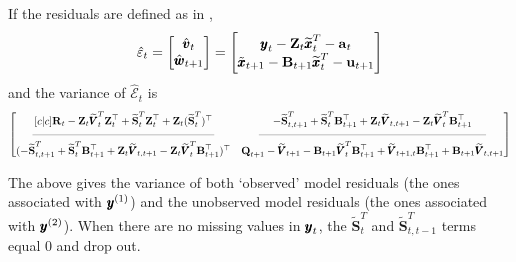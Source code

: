 \documentclass[]{article}
\def\UPS{\mbox{\boldmath $\Upsilon$}}
\def\XI{\mbox{\boldmath $\Xi$}}
\def\BB{\mbox{$\mathbf B$}}	\def\bb{\mbox{$\mathbf b$}} \def\Bb{\mbox{$\mathbf J$}} \def\Ba{\mbox{$\mathbf L$}} \def\Bm{\UPS}
\def\QQ{\mbox{$\mathbf Q$}}	 \def\qq{\mbox{$\mathbf q$}} \def\Qb{\mbox{$\mathbf G$}}  \def\Qm{\mathbb{Q}}
\def\RR{\mbox{$\mathbf R$}}	 \def\rr{\mbox{$\mathbf r$}} \def\Rb{\mbox{$\mathbf H$}}	\def\Rm{\mathbb{R}}
\def\Ss{\mbox{$\mathbf S$}}
\def\VV{\mbox{$\pmb{V}$}}	\def\vv{\mbox{$\pmb{v}$}}
\def\ZZ{\mbox{$\mathbf Z$}}	\def\zz{\mbox{$\mathbf z$}}	\def\Zb{\mbox{$\mathbf M$}} \def\Za{\mbox{$\mathbf N$}} \def\Zm{\XI}
\def\hatxt{\widetilde{\xx}_t^T}
\def\hatVt{\widetilde{\VV}_t^T}
\def\hatSt{\widetilde{\Ss}_t^T}
\def\hatSttm{\widetilde{\Ss}_t^{t-1}}
\def\hatSttm{\widetilde{\Ss}_{t,t-1}^T}
\def\hatSttp{\widetilde{\Ss}_{t,t+1}^T}
\begin{document}
If the residuals are defined as in \citet{Harveyetal1998},
\begin{equation}
\hat{\varepsilon}_t = \begin{bmatrix}\hat{\vv}_t\\ \hat{\ww}_{t+1}\end{bmatrix} =
\begin{bmatrix}\yy_t - \ZZ_t\hatxt-\aa_t\\ \tilde{\xx}_{t+1} - \BB_{t+1}\hatxt-\uu_{t+1} \end{bmatrix}
\end{equation}
and the variance of $\hat{\mathcal{E}}_t$ is
\begin{equation}\label{eqn:jointcondresid2}
\begin{bmatrix}[c|c]
\RR_t - \ZZ_t \hatVt \ZZ_t^\top + \hatSt\ZZ_t^\top + \ZZ_t(\hatSt)^\top&
- \hatSttp + \hatSt\BB_{t+1}^\top + \ZZ_t\widetilde{\VV}_{t,t+1} - \ZZ_t\hatVt\BB_{t+1}^\top \\
\rule[.5ex]{40ex}{0.25pt} & \rule[.5ex]{50ex}{0.25pt} \\
(- \hatSttp + \hatSt\BB_{t+1}^\top + \ZZ_t\widetilde{\VV}_{t,t+1} - \ZZ_t\hatVt\BB_{t+1}^\top)^\top& 
\QQ_{t+1} - \widetilde{\VV}_{t+1} - \BB_{t+1} \hatVt \BB_{t+1}^\top + \widetilde{\VV}_{t+1,t} \BB_{t+1}^\top + \BB_{t+1}\widetilde{\VV}_{t,t+1} \end{bmatrix}
\end{equation}

The above gives the variance of both `observed' model residuals (the ones associated with $\mbox{$\pmb{y}$}^{(1)}$) and the unobserved model residuals (the ones associated with $\mbox{$\pmb{y}$}^{(2)}$).  
When there are no missing values in $\mbox{$\pmb{y}$}_t$, the $\hatSt$ and $\hatSttm$ terms equal 0 and drop out.
\end{document}
